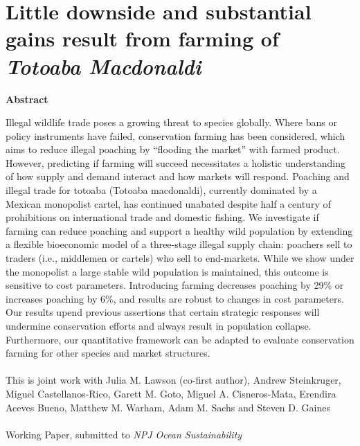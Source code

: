 \chapter{Little downside and substantial gains result from farming of \textit{Totoaba Macdonaldi}}

\begin{center}
\textbf{Abstract}\par
    \vspace*{.2cm}
    \noindent
    \begin{minipage}{0.9\textwidth}
Illegal wildlife trade poses a growing threat to species globally. Where bans or policy instruments have failed, conservation farming has been considered, which aims to reduce illegal poaching by “flooding the market” with farmed product. However, predicting if farming will succeed necessitates a holistic understanding of how supply and demand interact and how markets will respond. Poaching and illegal trade for totoaba (Totoaba macdonaldi), currently dominated by a Mexican monopolist cartel, has continued unabated despite half a century of prohibitions on international trade and domestic fishing. We investigate if farming can reduce poaching and support a healthy wild population by extending a flexible bioeconomic model of a three-stage illegal supply chain: poachers sell to traders (i.e., middlemen or cartels) who sell to end-markets. While we show under the monopolist a large stable wild population is maintained, this outcome is sensitive to cost parameters. Introducing farming decreases poaching by 29\% or increases poaching by 6\%, and results are robust to changes in cost parameters. Our results upend previous assertions that certain strategic responses will undermine conservation efforts and always result in population collapse. Furthermore, our quantitative framework can be adapted to evaluate conservation farming for other species and market structures.   \\\\
This is joint work with Julia M. Lawson (co-first author), Andrew Steinkruger, Miguel Castellanos-Rico, Garett M. Goto, Miguel A. Cisneros-Mata, Erendira Aceves Bueno, Matthew M. Warham, Adam M. Sachs and Steven D. Gaines \\\\
Working Paper, submitted to \textit{NPJ Ocean Sustainability}

\end{minipage}
\end{center}
    \vfill



